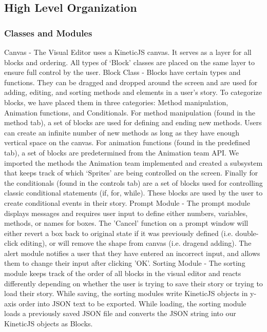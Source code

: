 \documentclass[a4paper]{article}
\begin{document}
\subsection{High Level Organization}
\subsubsection{Classes and Modules}
Canvas - The Visual Editor uses a KineticJS canvas. It serves as a layer for all blocks and ordering. All types of `Block' classes are placed on the same layer to ensure full control by the user. \newline \newline
Block Class - Blocks have certain types and functions. They can be dragged and dropped around the screen and are used for adding, editing, and sorting methods and elements in a user's story. To categorize blocks, we have placed them in three categories: Method manipulation, Animation functions, and Conditionals. For method manipulation (found in the method tab), a set of blocks are used for defining and ending new methods. Users can create an infinite number of new methods as long as they have enough vertical space on the canvas. For animation functions (found in the predefined tab), a set of blocks are predetermined from the Animation team API. We imported the methods the Animation team implemented and created a subsystem that keeps track of which `Sprites' are being controlled on the screen. Finally for the conditionals (found in the controls tab) are a set of blocks used for controlling classic conditional statements (if, for, while). These blocks are used by the user to create conditional events in their story.\newline \newline
Prompt Module - The prompt module displays messages and requires user input to define either numbers, variables, methods, or names for boxes. The 'Cancel' function on a prompt window will either revert a box back to original state if it was previously defined (i.e. double-click editing), or will remove the shape from canvas (i.e. dragend adding). The alert module notifies a user that they have entered an incorrect input, and allows them to change their input after clicking 'OK'. \newline \newline
Sorting Module - The sorting module keeps track of the order of all blocks in the visual editor and reacts differently depending on whether the user is trying to save their story or trying to load their story. While saving, the sorting modules write KineticJS objects in y-axis order into JSON text to be exported. While loading, the sorting module loads a previously saved JSON file and converts the JSON string into our KineticJS objects as Blocks.
\end{document}
